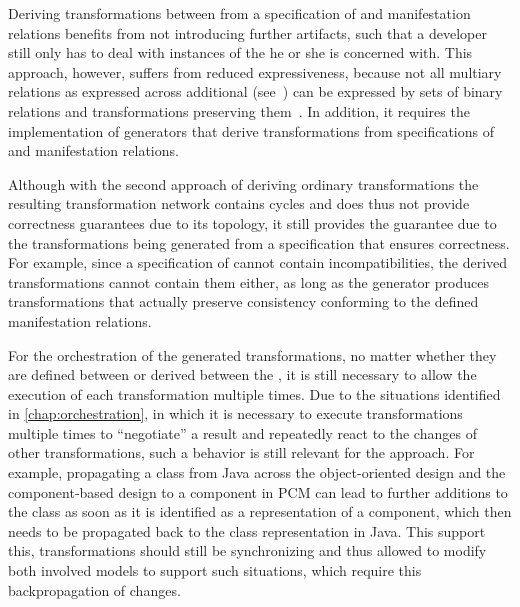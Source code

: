 Deriving transformations between \concretemetamodels from a specification of \conceptmetamodels and manifestation relations benefits from not introducing further artifacts, such that a developer still only has to deal with instances of the \concretemetamodels he or she is concerned with.
This approach, however, suffers from reduced expressiveness, because not all multiary relations as expressed across additional \conceptmetamodels (see~\cite{diskin2018MultiModelSynchronization-FASE}) can be expressed by sets of binary relations and transformations preserving them~\cite{stevens2020BidirectionalTransformationLarge-SoSym}.
In addition, it requires the implementation of generators that derive transformations from specifications of \conceptmetamodels and manifestation relations.

Although with the second approach of deriving ordinary transformations the resulting transformation network contains cycles and does thus not provide correctness guarantees due to its topology, it still provides the guarantee due to the transformations being generated from a specification that ensures correctness.
For example, since a specification of \commonalities cannot contain incompatibilities, the derived transformations cannot contain them either, as long as the generator produces transformations that actually preserve consistency conforming to the defined manifestation relations.

For the orchestration of the generated transformations, no matter whether they are defined between \conceptmetamodels or derived between the \concretemetamodels, it is still necessary to allow the execution of each transformation multiple times.
Due to the situations identified in \autoref{chap:orchestration}, in which it is necessary to execute transformations multiple times to \enquote{negotiate} a result and repeatedly react to the changes of other transformations, such a behavior is still relevant for the \commonalities approach.
For example, propagating a class from Java across the object-oriented design \conceptmetamodels and the component-based design \conceptmetamodel to a component in \gls{PCM} can lead to further additions to the class as soon as it is identified as a representation of a component, which then needs to be propagated back to the class representation in Java.
This support this, transformations should still be synchronizing and thus allowed to modify both involved models to support such situations, which require this backpropagation of changes.


